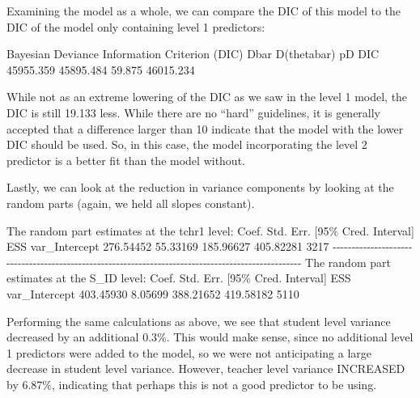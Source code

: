 \documentclass[
]{book}
\newenvironment{Shaded}{\begin{snugshade}}{\end{snugshade}}
\newcommand{\DecValTok}[1]{\textcolor[rgb]{0.00,0.00,0.81}{#1}}
\newcommand{\FloatTok}[1]{\textcolor[rgb]{0.00,0.00,0.81}{#1}}
\newcommand{\FunctionTok}[1]{\textcolor[rgb]{0.00,0.00,0.00}{#1}}
\newcommand{\NormalTok}[1]{#1}
\newcommand{\SpecialCharTok}[1]{\textcolor[rgb]{0.00,0.00,0.00}{#1}}
\begin{document}
Examining the model as a whole, we can compare the DIC of this model to the DIC of the model only containing level 1 predictors:

\begin{Shaded}
\begin{Highlighting}[]
\NormalTok{Bayesian Deviance Information }\FunctionTok{Criterion}\NormalTok{ (DIC)}
\NormalTok{Dbar      }\FunctionTok{D}\NormalTok{(thetabar)    pD      DIC}
\FloatTok{45955.359}  \FloatTok{45895.484}  \FloatTok{59.875}     \FloatTok{46015.234}   
\end{Highlighting}
\end{Shaded}

While not as an extreme lowering of the DIC as we saw in the level 1 model, the DIC is still 19.133 less. While there are no ``hard'' guidelines, it is generally accepted that a difference larger than 10 indicate that the model with the lower DIC should be used. So, in this case, the model incorporating the level 2 predictor is a better fit than the model without.

Lastly, we can look at the reduction in variance components by looking at the random parts (again, we held all slopes constant).

\begin{Shaded}
\begin{Highlighting}[]
\NormalTok{The random part estimates at the tchr1 level}\SpecialCharTok{:} 
\NormalTok{                    Coef.   Std. Err.   [}\DecValTok{95}\NormalTok{\% Cred.   Interval]    ESS }
\NormalTok{var\_Intercept   }\FloatTok{276.54452}    \FloatTok{55.33169}    \FloatTok{185.96627}   \FloatTok{405.82281}   \DecValTok{3217} 
\SpecialCharTok{{-}{-}{-}{-}{-}{-}{-}{-}{-}{-}{-}{-}{-}{-}{-}{-}{-}{-}{-}{-}{-}{-}{-}{-}{-}{-}{-}{-}{-}{-}{-}{-}{-}{-}{-}{-}{-}{-}{-}{-}{-}{-}{-}{-}{-}{-}{-}{-}{-}{-}{-}{-}{-}{-}{-}{-}{-}{-}{-}{-}{-}{-}{-}{-}{-}{-}{-}{-}{-}{-}{-}{-}{-}{-}{-}{-}{-}{-}{-}{-}{-}{-}{-}{-}{-}{-}{-}{-}{-}{-}{-}{-}{-}{-}{-}{-}{-}{-}{-}} 
\NormalTok{The random part estimates at the S\_ID level}\SpecialCharTok{:} 
\NormalTok{                    Coef.   Std. Err.   [}\DecValTok{95}\NormalTok{\% Cred.   Interval]    ESS }
\NormalTok{var\_Intercept   }\FloatTok{403.45930}     \FloatTok{8.05699}    \FloatTok{388.21652}   \FloatTok{419.58182}   \DecValTok{5110} 
\end{Highlighting}
\end{Shaded}

Performing the same calculations as above, we see that student level variance decreased by an additional 0.3\%. This would make sense, since no additional level 1 predictors were added to the model, so we were not anticipating a large decrease in student level variance. However, teacher level variance INCREASED by 6.87\%, indicating that perhaps this is not a good predictor to be using.
\end{document}
